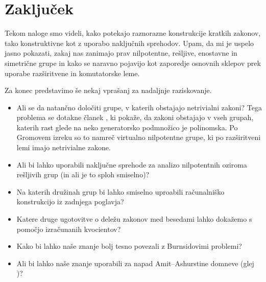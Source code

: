 \section{Zaključek}

Tekom naloge smo videli, kako potekajo raznorazne konstrukcije kratkih zakonov, tako konstruktivne kot z uporabo naključnih sprehodov.
Upam, da mi je uspelo jasno pokazati, zakaj nas zanimajo prav nilpotentne, rešljive, enostavne in simetrične grupe in kako se naravno pojavijo
kot zaporedje osnovnih sklepov prek uporabe razširitvene in komutatorske leme.

Za konec predstavimo še nekaj vprašanj za nadaljnje raziskovanje. \begin{itemize}
    \item Ali se da natančno določiti grupe, v katerih obstajajo netrivialni zakoni? Tega problema se dotakne članek \cite{Schleimer_2001},
    ki pokaže, da zakoni obstajajo v vseh grupah, katerih rast glede na neko generatorsko podmnožico je polinomska. Po Gromovem izreku \cite{Gromov_1981} so to namreč
    virtualno nilpotentne grupe, ki po razširitveni lemi imajo netrivialne zakone.
    \item Ali bi lahko uporabili naključne sprehode za analizo nilpotentnih oziroma rešljivih grup (in ali je to sploh smiselno)?
    \item Na katerih družinah grup bi lahko smiselno uproabili računalniško konstrukcijo iz zadnjega poglavja?
    \item Katere druge ugotovitve o deležu zakonov med besedami lahko dokažemo s pomočjo izračunanih kvocientov?
    \item Kako bi lahko naše znanje bolj tesno povezali z Burnsidovimi problemi?
    \item Ali bi lahko naše znanje uporabili za napad Amit–Ashurstine domneve (glej \cite{Chilebus_Cocke_Ho_2024})?
\end{itemize}